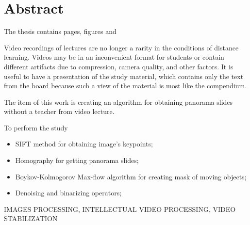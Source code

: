 \chapter*{Abstract}

The thesis contains 
pages,
figures
and 

Video recordings of lectures are no longer a rarity in 
the conditions of distance learning. 
Videos may be in an inconvenient format for 
students or contain different artifacts due 
to compression, camera quality, and other factors. 
It is useful to have a presentation of the study material, 
which contains only the text from the board 
because such a view of the material is most 
like the compendium. 

The item of this work 
is creating an algorithm for obtaining panorama 
slides without a teacher from video lecture.

To perform the study
\begin{itemize}
  \item
    SIFT method for obtaining image's keypoints;
  \item 
    Homography for getting panorama slides;
  \item 
    Boykov-Kolmogorov Max-flow algorithm for creating mask of
    moving objects;
  \item
    Denoising and binarizing operators;
\end{itemize}

\MakeUppercase{images processing, intellectual video 
processing, video 
stabilization}
